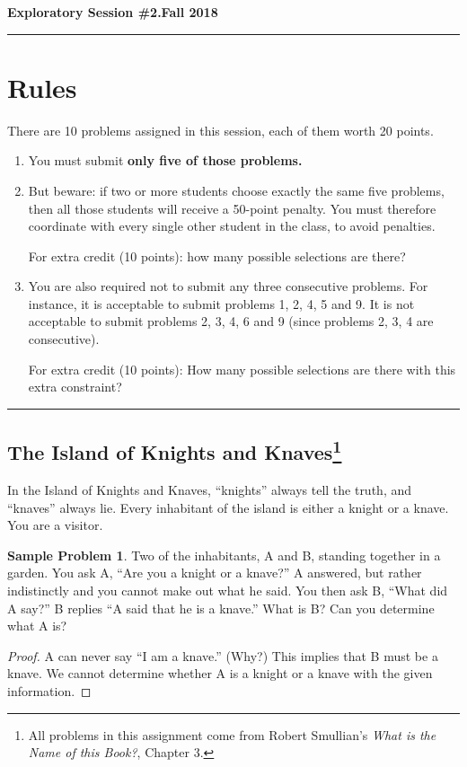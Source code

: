 \documentclass[11pt]{article}
\theoremstyle{definition}
\newtheorem*{problem*}{Sample Problem}
\begin{document}
\hfill{\large\bf Exploratory Session \#2.}\hfill{\large\bf  Fall 2018}\hrule

\section*{Rules}
There are 10 problems assigned in this session, each of them worth 20 points.
\begin{enumerate}
\item You must submit \textbf{only five of those problems.}
\item But beware: if two or more students choose exactly the same five problems, then all those students will receive a
  50-point penalty.  You must therefore coordinate with every single other student in the class, to avoid penalties.

  For extra credit (10 points): how many possible selections are there?
\item You are also required not to submit any three consecutive problems. For instance, it is acceptable to submit
  problems 1, 2, 4, 5 and 9.  It is not acceptable to submit problems 2, 3, 4, 6 and 9 (since problems 2, 3, 4 are
  consecutive).

  For extra credit (10 points): How many possible selections are there with this extra constraint? 
\end{enumerate}
\hrule

\subsection*{The Island of Knights and Knaves\footnote{All problems in this assignment come from Robert Smullian's
  \emph{What is the Name of this Book?}, Chapter 3.}}
In the Island of Knights and Knaves, ``knights'' always tell the truth, and ``knaves'' always lie.  Every inhabitant of
the island is either a knight or a knave.  You are a visitor.

\begin{problem*}
  Two of the inhabitants, A and B, standing together in a garden.  You ask A, ``Are you a knight or a knave?''  A
  answered, but rather indistinctly and you cannot make out what he said.  You then ask B, ``What did A say?''  B
  replies ``A said that he is a knave.''
  What is B? Can you determine what A is?
\end{problem*}
\begin{proof}
A can never say ``I am a knave.'' (Why?)  This implies that B must be a knave.  We cannot determine whether A is a
knight or a knave with the given information.
\end{proof}
\end{document}
